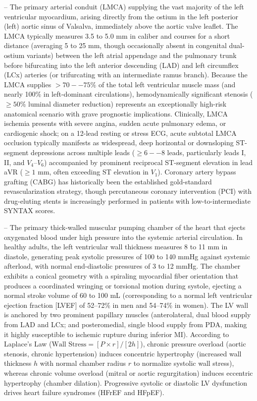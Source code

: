 -- The primary arterial conduit (LMCA) supplying the vast majority of the left ventricular myocardium, arising directly from the ostium in the left posterior (left) aortic sinus of Valsalva, immediately above the aortic valve leaflet. The LMCA typically measures 3.5 to 5.0 mm in caliber and courses for a short distance (averaging 5 to 25 mm, though occasionally absent in congenital dual-ostium variants) between the left atrial appendage and the pulmonary trunk before bifurcating into the left anterior descending (LAD) and left circumflex (LCx) arteries (or trifurcating with an intermediate ramus branch). Because the LMCA supplies $>70--75\%$ of the total left ventricular muscle mass (and nearly 100\% in left-dominant circulations), hemodynamically significant stenosis ($\ge 50\%$ luminal diameter reduction) represents an exceptionally high-risk anatomical scenario with grave prognostic implications. Clinically, LMCA ischemia presents with severe angina, sudden acute pulmonary edema, or cardiogenic shock; on a 12-lead resting or stress ECG, acute subtotal LMCA occlusion typically manifests as widespread, deep horizontal or downsloping ST-segment depressions across multiple leads ($\ge 6--8$ leads, particularly leads I, II, and $V_4$--$V_6$) accompanied by prominent reciprocal ST-segment elevation in lead aVR ($\ge 1$ mm, often exceeding ST elevation in $V_1$). Coronary artery bypass grafting (CABG) has historically been the established gold-standard revascularization strategy, though percutaneous coronary intervention (PCI) with drug-eluting stents is increasingly performed in patients with low-to-intermediate SYNTAX scores.

-- The primary thick-walled muscular pumping chamber of the heart that ejects oxygenated blood under high pressure into the systemic arterial circulation. In healthy adults, the left ventricular wall thickness measures 8 to 11 mm in diastole, generating peak systolic pressures of 100 to 140 mmHg against systemic afterload, with normal end-diastolic pressures of 3 to 12 mmHg. The chamber exhibits a conical geometry with a spiraling myocardial fiber orientation that produces a coordinated wringing or torsional motion during systole, ejecting a normal stroke volume of 60 to 100 mL (corresponding to a normal left ventricular ejection fraction [LVEF] of 52--72\% in men and 54--74\% in women). The LV wall is anchored by two prominent papillary muscles (anterolateral, dual blood supply from LAD and LCx; and posteromedial, single blood supply from PDA, making it highly susceptible to ischemic rupture during inferior MI). According to Laplace's Law ($\text{Wall Stress} = [P \times r] / [2h]$), chronic pressure overload (aortic stenosis, chronic hypertension) induces concentric hypertrophy (increased wall thickness $h$ with normal chamber radius $r$ to normalize systolic wall stress), whereas chronic volume overload (mitral or aortic regurgitation) induces eccentric hypertrophy (chamber dilation). Progressive systolic or diastolic LV dysfunction drives heart failure syndromes (HFrEF and HFpEF).

